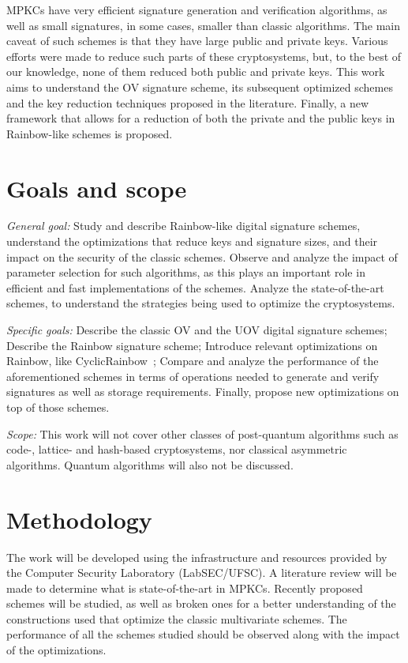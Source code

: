 \documentclass{ufsctex/ufsctex}
\begin{document}
MPKCs have very efficient signature generation and verification algorithms, as
well as small signatures, in some cases, smaller than classic algorithms. The
main caveat of such schemes is that they have large public and private keys.
Various efforts were made to reduce such parts of these cryptosystems, but, to
the best of our knowledge, none of them reduced both public and private keys.
This work aims to understand the OV signature scheme, its subsequent optimized
schemes and the key reduction techniques proposed in the literature. Finally, a
new framework that allows for a reduction of both the private and the public
keys in Rainbow-like schemes is proposed.

\section{Goals and scope}

\textit{General goal:} Study and describe Rainbow-like digital signature
schemes, understand the optimizations that reduce keys and signature sizes, and
their impact on the security of the classic schemes. Observe and analyze the
impact of parameter selection for such algorithms, as this plays an important
role in efficient and fast implementations of the schemes. Analyze the
state-of-the-art schemes, to understand the strategies being used to optimize
the cryptosystems.

\textit{Specific goals:} Describe the classic OV and the UOV digital signature
schemes; Describe the Rainbow signature scheme; Introduce relevant
optimizations on Rainbow, like CyclicRainbow~\cite{petzoldt2010cyclicrainbow};
Compare and analyze the performance of the aforementioned schemes in terms of
operations needed to generate and verify signatures as well as storage
requirements. Finally, propose new optimizations on top of those schemes.

\textit{Scope:} This work will not cover other classes of post-quantum
algorithms such as code-, lattice- and hash-based cryptosystems, nor classical
asymmetric algorithms. Quantum algorithms will also not be discussed.

\section{Methodology}

The work will be developed using the infrastructure and resources provided by
the Computer Security Laboratory (LabSEC/UFSC). A literature review will be
made to determine what is state-of-the-art in MPKCs. Recently proposed schemes
will be studied, as well as broken ones for a better understanding of the
constructions used that optimize the classic multivariate schemes. The
performance of all the schemes studied should be observed along with the impact
of the optimizations.
\end{document}
